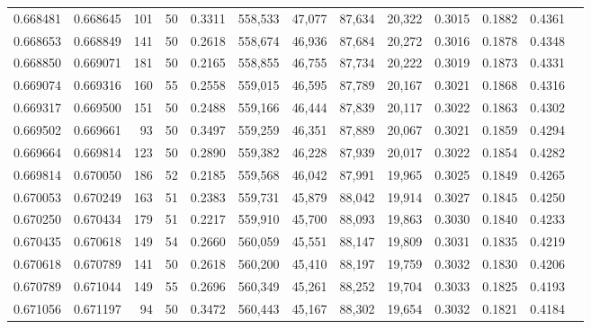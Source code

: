 \begin{tabular}{rrrrrrrrrrrrr}
0.668481 & 0.668645 &   101 &  50 &                                     0.3311 & 558,533 &  47,077 &  87,634 &  20,322 & 0.3015 & 0.1882 & 0.4361 \\
0.668653 & 0.668849 &   141 &  50 &                                     0.2618 & 558,674 &  46,936 &  87,684 &  20,272 & 0.3016 & 0.1878 & 0.4348 \\
0.668850 & 0.669071 &   181 &  50 &                                     0.2165 & 558,855 &  46,755 &  87,734 &  20,222 & 0.3019 & 0.1873 & 0.4331 \\
0.669074 & 0.669316 &   160 &  55 &                                     0.2558 & 559,015 &  46,595 &  87,789 &  20,167 & 0.3021 & 0.1868 & 0.4316 \\
0.669317 & 0.669500 &   151 &  50 &                                     0.2488 & 559,166 &  46,444 &  87,839 &  20,117 & 0.3022 & 0.1863 & 0.4302 \\
0.669502 & 0.669661 &    93 &  50 &                                     0.3497 & 559,259 &  46,351 &  87,889 &  20,067 & 0.3021 & 0.1859 & 0.4294 \\
0.669664 & 0.669814 &   123 &  50 &                                     0.2890 & 559,382 &  46,228 &  87,939 &  20,017 & 0.3022 & 0.1854 & 0.4282 \\
0.669814 & 0.670050 &   186 &  52 &                                     0.2185 & 559,568 &  46,042 &  87,991 &  19,965 & 0.3025 & 0.1849 & 0.4265 \\
0.670053 & 0.670249 &   163 &  51 &                                     0.2383 & 559,731 &  45,879 &  88,042 &  19,914 & 0.3027 & 0.1845 & 0.4250 \\
0.670250 & 0.670434 &   179 &  51 &                                     0.2217 & 559,910 &  45,700 &  88,093 &  19,863 & 0.3030 & 0.1840 & 0.4233 \\
0.670435 & 0.670618 &   149 &  54 &                                     0.2660 & 560,059 &  45,551 &  88,147 &  19,809 & 0.3031 & 0.1835 & 0.4219 \\
0.670618 & 0.670789 &   141 &  50 &                                     0.2618 & 560,200 &  45,410 &  88,197 &  19,759 & 0.3032 & 0.1830 & 0.4206 \\
0.670789 & 0.671044 &   149 &  55 &                                     0.2696 & 560,349 &  45,261 &  88,252 &  19,704 & 0.3033 & 0.1825 & 0.4193 \\
0.671056 & 0.671197 &    94 &  50 &                                     0.3472 & 560,443 &  45,167 &  88,302 &  19,654 & 0.3032 & 0.1821 & 0.4184 \\

\end{tabular}
